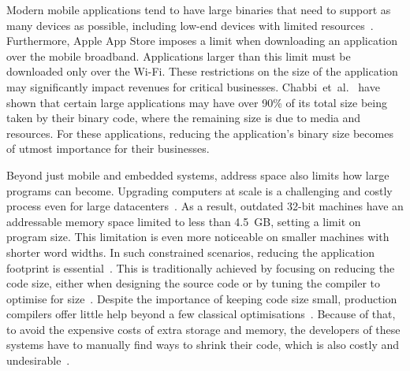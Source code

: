 Modern mobile applications tend to have large binaries that need to support as many devices as possible, including low-end devices with limited resources~\cite{hart02,etzo10}.
Furthermore, Apple App Store imposes a limit when downloading an application over the mobile broadband.
Applications larger than this limit must be downloaded only over the Wi-Fi.
These restrictions on the size of the application may significantly impact revenues for critical businesses.
Chabbi~et~al.~\cite{chabbi21} have shown that certain large applications may have over 90\%
of its total size being taken by their binary code, where the remaining size is due to media and resources.
For these applications, reducing the application's binary size becomes of utmost importance for their businesses.


Beyond just mobile and embedded systems, address space also limits how large programs can become.
Upgrading computers at scale is a challenging and costly process even for large datacenters~\cite{yan16,neamtiu11}.
As a result, outdated 32-bit machines have an addressable memory space limited to less than 4.5~GB, setting a limit on program size.
This limitation is even more noticeable on smaller machines with shorter word widths.
In such constrained scenarios, reducing the application footprint is essential~\cite{schultz03,varma04,sehgal12,keoh14,auler17}.
This is traditionally achieved by focusing on reducing the code size, either when designing the source code or by tuning the compiler to optimise for size~\cite{fisher05,sehgal12,hennessy17,rocha19}.
Despite the importance of keeping code size small, production compilers offer little help beyond a few classical optimisations~\cite{cocke70,briggs97,debray00}.
Because of that, to avoid the expensive costs of extra storage and memory, the developers of these systems have to manually find ways to shrink their code, which is also costly and undesirable~\cite{keoh14,weaver09}.

